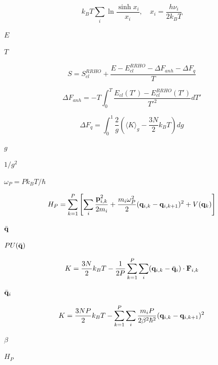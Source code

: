 \documentclass{article}
\begin{document}
\[ k_BT\sum_i \ln\frac{\sinh x_i}{x_i},\quad x_i = \frac{h\nu_i}{2k_BT} \]
\pagebreak

$E$
\pagebreak

$T$
\pagebreak

\[ S = S_{cl}^{RRHO} + \frac{E - E_{cl}^{RRHO} - \Delta F_{anh} - \Delta F_q}{T} \]
\pagebreak

\[ \Delta F_{anh} = -T\int_0^T \frac{E_{cl}(T') - E_{cl}^{RRHO}(T')}{T'^2}dT' \]
\pagebreak

\[ \Delta F_q = \int_0^1 \frac{2}{g}\left(\langle K\rangle_g - \frac{3N}{2}k_BT\right)dg \]
\pagebreak

$g$
\pagebreak

$1/g^2$
\pagebreak

$\omega_P = P k_B T/\hbar$
\pagebreak

\[ H_P = \sum_{k=1}^P \left[ \sum_i \frac{{\bf p}_{i,k}^2}{2m_i} +
\frac{m_i\omega_P^2}{2}({\bf q}_{i,k}-{\bf q}_{i,k+1})^2 + V({\bf q}_k) \right] \]
\pagebreak

$\bar{\bf q}$
\pagebreak

$P U(\bar{\bf q})$
\pagebreak

\[ K = \frac{3N}{2}k_B T - \frac{1}{2P}\sum_{k=1}^P\sum_i
({\bf q}_{i,k}-\bar{\bf q}_i)\cdot{\bf F}_{i,k} \]
\pagebreak

$\bar{\bf q}_i$
\pagebreak

\[ K = \frac{3NP}{2}k_B T - \sum_{k=1}^P\sum_i \frac{m_i P}{2\beta^2\hbar^2}
({\bf q}_{i,k}-{\bf q}_{i,k+1})^2 \]
\pagebreak

$\beta$
\pagebreak

$H_P$
\pagebreak
\end{document}
